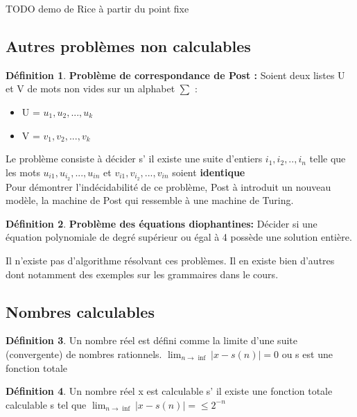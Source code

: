 \documentclass[11pt,a4paper]{article}
\theoremstyle{definition}
\newtheorem{mydef}{Définition}
\begin{document}
TODO demo de Rice à partir du point fixe

\subsection{Autres problèmes non calculables}
\label{sub:autres_probl_mes_non_calculable}

\begin{mydef}
	\textbf{Problème de correspondance de Post :} Soient deux listes U et V 
	de mots non vides sur un alphabet $\sum$ : 
	\begin{itemize}
		\item U = ${u_1,u_2,...,u_k}$
		\item V = ${v_1,v_2,...,v_k}$
	\end{itemize}
	Le problème consiste à décider s’ il existe une suite d'entiers 
	$i_1,i_2,..,i_n$ telle que les mots $u_{i1},u_{i_2},...,u_{in}$ et 
	$v_{i1},v_{i_2},...,v_{in}$ soient \textbf{identique} \\
	Pour démontrer l'indécidabilité de ce problème, Post à introduit un 
	nouveau modèle, la machine de Post qui ressemble à une machine de Turing.
\end{mydef}

\begin{mydef}
	\textbf{Problème des équations diophantines:} Décider si une équation 
	polynomiale de degré supérieur ou égal à 4 possède une solution entière.
\end{mydef}

Il n'existe pas d'algorithme résolvant ces problèmes. Il en existe bien d'autres 
dont notamment des exemples sur les grammaires dans le cours.

\subsection{Nombres calculables}
\label{sub:nombres_calculables}

\begin{mydef}
	Un nombre réel est défini comme la limite d'une suite (convergente) de 
	nombres rationnels. $\lim_{n \rightarrow \inf} |x-s(n)| = 0 $ ou s est 
	une fonction totale
\end{mydef}

\begin{mydef}
	Un nombre réel x est calculable s’ il existe une fonction totale 
	calculable s tel que $\lim_{n \rightarrow \inf} |x-s(n)| =\leq 2^{-n}$
\end{mydef}
\end{document}
